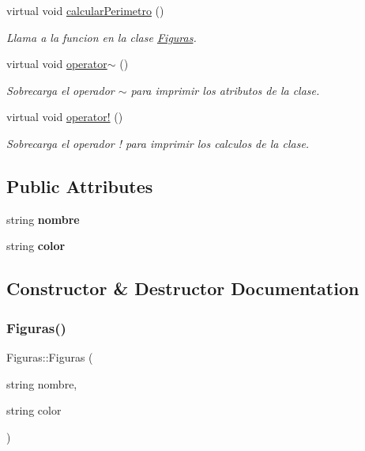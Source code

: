 \begin{DoxyCompactItemize}
virtual void \hyperlink{class_figuras_a90c8e15e0a6a982baa363bff28d4774d}{calcular\+Perimetro} ()
\begin{DoxyCompactList}\small\item\em Llama a la funcion en la clase \hyperlink{class_figuras}{Figuras}. \end{DoxyCompactList}\item 
\hypertarget{class_figuras_aa5b277011447abd9b97f305f71635077}{}\label{class_figuras_aa5b277011447abd9b97f305f71635077} 
virtual void \hyperlink{class_figuras_aa5b277011447abd9b97f305f71635077}{operator$\sim$} ()
\begin{DoxyCompactList}\small\item\em Sobrecarga el operador $\sim$ para imprimir los atributos de la clase. \end{DoxyCompactList}\item 
\hypertarget{class_figuras_a71c13069c91f1613b77e5d761a7598e7}{}\label{class_figuras_a71c13069c91f1613b77e5d761a7598e7} 
virtual void \hyperlink{class_figuras_a71c13069c91f1613b77e5d761a7598e7}{operator!} ()
\begin{DoxyCompactList}\small\item\em Sobrecarga el operador ! para imprimir los calculos de la clase. \end{DoxyCompactList}\end{DoxyCompactItemize}
\subsection*{Public Attributes}
\begin{DoxyCompactItemize}
\item 
\hypertarget{class_figuras_a88b1e8e830f6810b4bafabfe081ba8ec}{}\label{class_figuras_a88b1e8e830f6810b4bafabfe081ba8ec} 
string {\bfseries nombre}
\item 
\hypertarget{class_figuras_af1980b3c371490afbd9d986748c70b25}{}\label{class_figuras_af1980b3c371490afbd9d986748c70b25} 
string {\bfseries color}
\end{DoxyCompactItemize}


\subsection{Constructor \& Destructor Documentation}
\hypertarget{class_figuras_aa27ab1cfbd67dc1d7b806065586875f7}{}\label{class_figuras_aa27ab1cfbd67dc1d7b806065586875f7} 
\subsubsection{\texorpdfstring{Figuras()}{Figuras()}\hspace{0.1cm}{\footnotesize\ttfamily [1/2]}}
{\ttfamily Figuras\+::\+Figuras (\begin{DoxyParamCaption}\item[{string}]{nombre,  }\item[{string}]{color }\end{DoxyParamCaption})}




